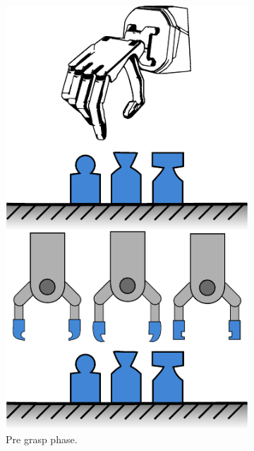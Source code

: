 \begin{figure}[h]
	\centering
	\begin{subfigure}[b]{0.24\textwidth}
		\centering
		\includegraphics[width=\textwidth]{chapters/introduction/fig/pipeline-1.pdf}
		\caption{Pre grasp phase.}
		\label{fig:pre-grasp-phase}
	\end{subfigure}
	\hfill
	\begin{subfigure}[b]{0.24\textwidth}
		\centering

\end{subfigure}
\end{figure}
